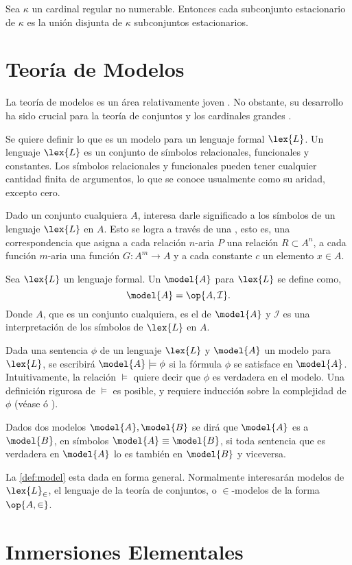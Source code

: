 \begin{teo}\label{teo:solovay}
    Sea $\kappa$ un cardinal regular no numerable. Entonces cada subconjunto estacionario
    de $\kappa$ es la unión disjunta de $\kappa$ subconjuntos estacionarios.
\end{teo}

\section{Teoría de Modelos}
\label{sec:models}

La teoría de modelos es un área relativamente joven \autocite[pág. 3]{chang_model_2012}.
No obstante, su desarrollo ha sido crucial para la teoría de conjuntos y los
cardinales grandes \autocite[pág. xv]{kanamori_higher_2009}.

Se quiere definir lo que es un modelo para un lenguaje formal $\lex{L}$.
Un lenguaje $\lex{L}$ es un conjunto de símbolos relacionales, funcionales y constantes.
Los símbolos relacionales y funcionales pueden tener cualquier cantidad finita de argumentos,
lo que se conoce usualmente como su aridad, excepto cero.

Dado un conjunto cualquiera $A$, interesa darle significado a los símbolos de un
lenguaje $\lex{L}$ en $A$. Esto se logra a través de una , esto es,
una correspondencia que asigna a cada relación $n$-aria $P$ una relación
$R\subset A^n$, a cada función $m$-aria una función $G\colon A^m\to A$ y a cada
constante $c$ un elemento $x\in A$.

\begin{defi}\label{def:model}
    Sea $\lex{L}$ un lenguaje formal. Un  $\model{A}$ para $\lex{L}$ se define como,
    \[
        \model{A} = \op{A, \mathcal{I}}.
    \]
    Donde $A$, que es un conjunto cualquiera, es el  de $\model{A}$ y
    $\mathcal{I}$ es una interpretación de los símbolos de $\lex{L}$ en $A$.
\end{defi}

Dada una sentencia $\phi$ de un lenguaje $\lex{L}$ y $\model{A}$ un modelo para $\lex{L}$,
se escribirá $\model{A}\models\phi$ si la fórmula $\phi$ se satisface en $\model{A}$.
Intuitivamente, la relación $\models$ quiere decir que $\phi$ es verdadera en el modelo.
Una definición rigurosa de $\models$ es posible, y requiere inducción sobre la complejidad
de $\phi$ (véase \autocite[\S 1.3]{chang_model_2012} ó \autocite[\S 12]{jech_set_2003}).

Dados dos modelos $\model{A}, \model{B}$ se dirá que $\model{A}$ es  a $\model{B}$, en símbolos $\model{A}\equiv \model{B}$, si toda sentencia
que es verdadera en $\model{A}$ lo es también en $\model{B}$ y viceversa.

La \cref{def:model} esta dada en forma general. Normalmente interesarán modelos de $\lex{L}_\in$,
el lenguaje de la teoría de conjuntos, o $\in$-modelos de la forma $\op{A,\in}$.

\section{Inmersiones Elementales}
\label{sec:elem-embed}
